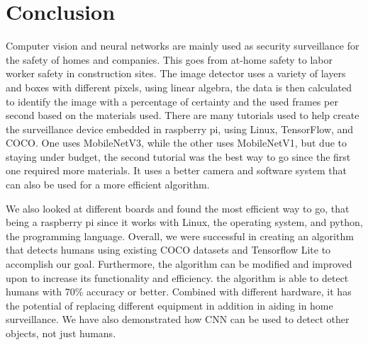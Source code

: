 \section{Conclusion}
Computer vision and neural networks are mainly used as security surveillance for the safety of homes and companies. This goes from at-home safety to labor worker safety in construction sites. The image detector uses a variety of layers and boxes with different pixels, using linear algebra, the data is then calculated to identify the image with a percentage of certainty and the used frames per second based on the materials used.  There are many tutorials used to help create the surveillance device embedded in raspberry pi, using Linux, TensorFlow, and COCO. One uses MobileNetV3, while the other uses MobileNetV1, but due to staying under budget, the second tutorial was the best way to go since the first one required more materials. It uses a better camera and software system that can also be used for a more efficient algorithm. 

We also looked at different boards and found the most efficient way to go, that being a raspberry pi since it works with Linux, the operating system, and python, the programming language. Overall, we were successful in creating an algorithm that detects humans using existing COCO datasets and Tensorflow Lite to accomplish our goal. Furthermore, the algorithm can be modified and improved upon to increase its functionality and efficiency. the algorithm is able to detect humans with 70\% accuracy or better. Combined with different hardware, it has the potential of replacing different equipment in addition in aiding in home surveillance. We have also demonstrated how CNN can be used to detect other objects, not just humans.

